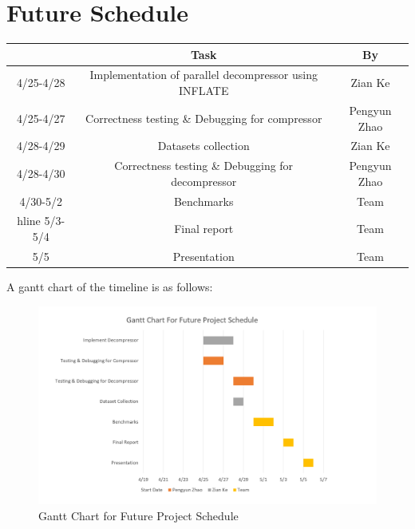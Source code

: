 \documentclass{article}
\begin{document}
\section{Future Schedule}
\begin{table}[!hbp]
\begin{center}
\begin{tabular}{|c|c|c|}
\hline
 & Task & By\\ \hline
4/25-4/28 & Implementation of parallel decompressor using INFLATE & Zian Ke \\ \hline
4/25-4/27 & Correctness testing \& Debugging for compressor & Pengyun Zhao\\ \hline
4/28-4/29 & Datasets collection & Zian Ke \\ \hline
4/28-4/30 & Correctness testing \& Debugging for decompressor & Pengyun Zhao\\ \hline
4/30-5/2 & Benchmarks & Team \\hline
5/3-5/4 & Final report & Team\\ \hline
5/5 & Presentation & Team\\ \hline
\end{tabular}
\end{center}
\end{table}
A gantt chart of the timeline is as follows:
\newpage
\begin{figure}[!h]
    \begin{center}
        \includegraphics[width = 15cm]{gantt.png}
        \caption{Gantt Chart for Future Project Schedule}
    \end{center}
\end{figure}
\end{document}
